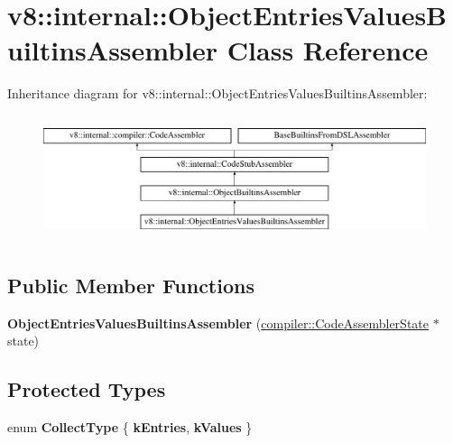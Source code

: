 \hypertarget{classv8_1_1internal_1_1ObjectEntriesValuesBuiltinsAssembler}{}\section{v8\+:\+:internal\+:\+:Object\+Entries\+Values\+Builtins\+Assembler Class Reference}
\label{classv8_1_1internal_1_1ObjectEntriesValuesBuiltinsAssembler}
Inheritance diagram for v8\+:\+:internal\+:\+:Object\+Entries\+Values\+Builtins\+Assembler\+:\begin{figure}[H]
\begin{center}
\leavevmode
\includegraphics[height=3.708609cm]{classv8_1_1internal_1_1ObjectEntriesValuesBuiltinsAssembler}
\end{center}
\end{figure}
\subsection*{Public Member Functions}
\begin{DoxyCompactItemize}
\item 
\mbox{\label{classv8_1_1internal_1_1ObjectEntriesValuesBuiltinsAssembler_aa48384790ef15214e7509c70c52d2056}} 
{\bfseries Object\+Entries\+Values\+Builtins\+Assembler} (\mbox{\hyperlink{classv8_1_1internal_1_1compiler_1_1CodeAssemblerState}{compiler\+::\+Code\+Assembler\+State}} $\ast$state)
\end{DoxyCompactItemize}
\subsection*{Protected Types}
\begin{DoxyCompactItemize}
\item 
\mbox{\label{classv8_1_1internal_1_1ObjectEntriesValuesBuiltinsAssembler_a520f4a300c60b11b9824c94624c3f087}} 
enum {\bfseries Collect\+Type} \{ {\bfseries k\+Entries}, 
{\bfseries k\+Values}
 \}
\end{DoxyCompactItemize}
